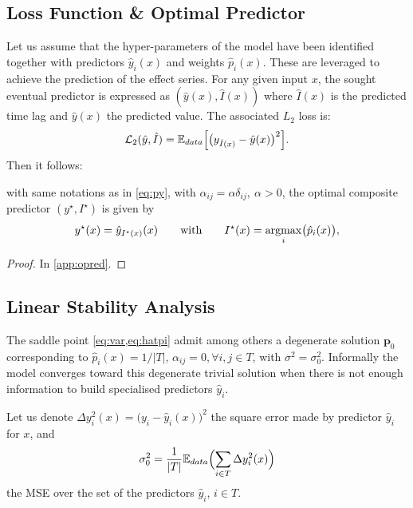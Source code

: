 \subsection{Loss Function \& Optimal Predictor}\label{sec:prop}
Let us assume that the hyper-parameters of the model have been identified together with predictors 
$\hat y_i(x)$ and weights $\hat p_i(x)$. These are leveraged to achieve the prediction of the 
effect series. For any given input $x$, the sought eventual predictor is expressed as 
$(\hat y(x),\hat I(x))$ where $\hat I(x)$ is the predicted time lag and $\hat y(x)$ the predicted 
value. The associated $L_2$ loss is: 
%
\begin{equation}\label{eq:orloss}
  {\cal L}_2(\hat y,\hat I) = {\mathbb E}_{data}\Bigl[\bigl(y_{\hat I(x)}-\hat y(x)\bigr)^2\Bigr]. 
\end{equation}
%
Then it follows:
%
\begin{prop}\label{prop:opred}
with same notations as in \cref{eq:py}, with $\alpha_{ij} = \alpha\delta_{ij},\ \alpha>0$, 
the optimal composite predictor $(y^\star,I^\star)$ is given by
\[
  y^\star(x) = 
    \hat y_{I^\star(x)}(x)\qquad\text{with}\qquad I^\star(x) = \operatorname*{argmax}_{i} \bigl(\hat p_i(x)\bigr), 
\]
\end{prop}
%
\begin{proof}
In \cref{app:opred}.
\end{proof}

\subsection{Linear Stability Analysis}\label{sec:stability}
The saddle point \cref{eq:var,eq:hatpi} admit among others a degenerate solution 
$\mathbf{p}_0$ corresponding to $\hat p_i(x) = 1/\vert T\vert$, 
$\alpha_{ij}=0, \forall i,j \in T$, with $\sigma^2 = \sigma_0^2$. Informally the model converges 
toward this degenerate trivial solution when there is not enough information to build specialised 
predictors $\hat y_i$. 

Let us denote $\Delta y_i^2(x)= \bigl(y_i-\hat y_i(x)\bigr)^2$ the square error made by predictor 
$\hat y_i$ for $x$, and 
\[
  \sigma_0^2 = \frac{1}{|T|}{\mathbb E}_{data}\Bigl(\sum_{i \in T } \Delta y_i^2(x)\Bigr)
\]
the MSE over the set of the predictors $\hat y_i$, $i \in T$. 

